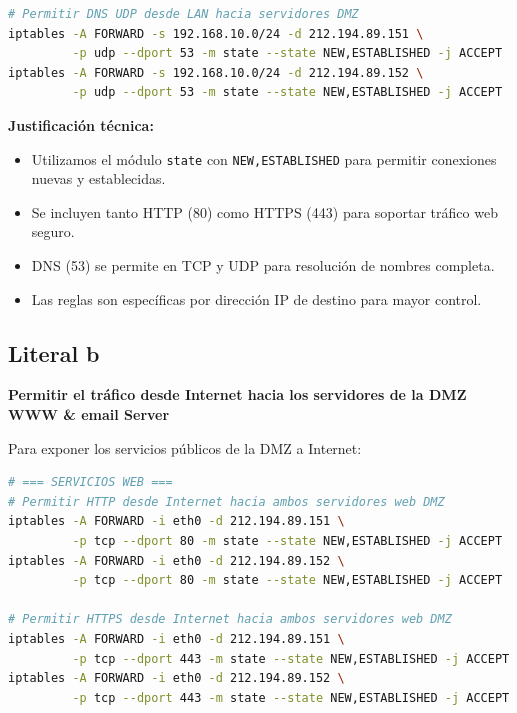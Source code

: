 {\begin{lstlisting}[language=bash, caption=Reglas para tráfico LAN hacia DMZ]
# Permitir DNS UDP desde LAN hacia servidores DMZ
iptables -A FORWARD -s 192.168.10.0/24 -d 212.194.89.151 \
         -p udp --dport 53 -m state --state NEW,ESTABLISHED -j ACCEPT
iptables -A FORWARD -s 192.168.10.0/24 -d 212.194.89.152 \
         -p udp --dport 53 -m state --state NEW,ESTABLISHED -j ACCEPT
\end{lstlisting}

\textbf{Justificación técnica:}
\begin{itemize}
    \item Utilizamos el módulo \texttt{state} con \texttt{NEW,ESTABLISHED} para permitir conexiones nuevas y establecidas.
    \item Se incluyen tanto HTTP (80) como HTTPS (443) para soportar tráfico web seguro.
    \item DNS (53) se permite en TCP y UDP para resolución de nombres completa.
    \item Las reglas son específicas por dirección IP de destino para mayor control.
\end{itemize}

\subsection{Literal b}
\textbf{Permitir el tráfico desde Internet hacia los servidores de la DMZ WWW \& email Server}


Para exponer los servicios públicos de la DMZ a Internet:

\begin{lstlisting}[language=bash, caption=Reglas para servicios públicos en DMZ]
# === SERVICIOS WEB ===
# Permitir HTTP desde Internet hacia ambos servidores web DMZ
iptables -A FORWARD -i eth0 -d 212.194.89.151 \
         -p tcp --dport 80 -m state --state NEW,ESTABLISHED -j ACCEPT
iptables -A FORWARD -i eth0 -d 212.194.89.152 \
         -p tcp --dport 80 -m state --state NEW,ESTABLISHED -j ACCEPT

# Permitir HTTPS desde Internet hacia ambos servidores web DMZ
iptables -A FORWARD -i eth0 -d 212.194.89.151 \
         -p tcp --dport 443 -m state --state NEW,ESTABLISHED -j ACCEPT
iptables -A FORWARD -i eth0 -d 212.194.89.152 \
         -p tcp --dport 443 -m state --state NEW,ESTABLISHED -j ACCEPT


\end{lstlisting}}
